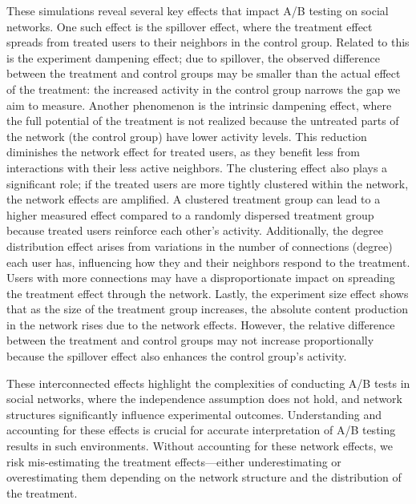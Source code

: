 \documentclass[final,5p,times,twocolumn,authoryear]{elsarticle}
\begin{document}
These simulations reveal several key effects that impact A/B testing on social networks. One such effect is the spillover effect, where the treatment effect spreads from treated users to their neighbors in the control group. Related to this is the experiment dampening effect; due to spillover, the observed difference between the treatment and control groups may be smaller than the actual effect of the treatment: the increased activity in the control group narrows the gap we aim to measure. Another phenomenon is the intrinsic dampening effect, where the full potential of the treatment is not realized because the untreated parts of the network (the control group) have lower activity levels. This reduction diminishes the network effect for treated users, as they benefit less from interactions with their less active neighbors. The clustering effect also plays a significant role; if the treated users are more tightly clustered within the network, the network effects are amplified. A clustered treatment group can lead to a higher measured effect compared to a randomly dispersed treatment group because treated users reinforce each other's activity. Additionally, the degree distribution effect arises from variations in the number of connections (degree) each user has, influencing how they and their neighbors respond to the treatment. Users with more connections may have a disproportionate impact on spreading the treatment effect through the network. Lastly, the experiment size effect shows that as the size of the treatment group increases, the absolute content production in the network rises due to the network effects. However, the relative difference between the treatment and control groups may not increase proportionally because the spillover effect also enhances the control group's activity.

These interconnected effects highlight the complexities of conducting A/B tests in social networks, where the independence assumption does not hold, and network structures significantly influence experimental outcomes. Understanding and accounting for these effects is crucial for accurate interpretation of A/B testing results in such environments.
Without accounting for these network effects, we risk mis-estimating the treatment effects—either underestimating or overestimating them depending on the network structure and the distribution of the treatment.
\end{document}

